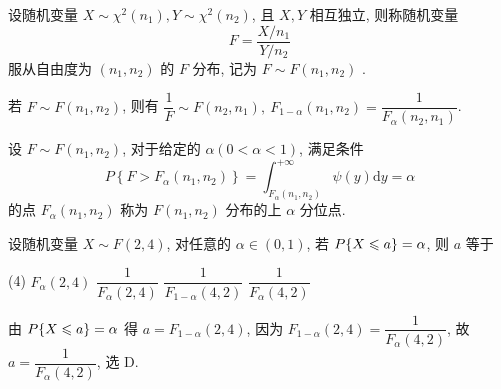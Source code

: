 \begin{definition}[$F$ 分布]
    设随机变量 $ X \sim \chi^{2}\left(n_{1}\right), Y \sim \chi^{2}\left(n_{2}\right)$, 且 $ X, Y $ 相互独立, 则称随机变量
    $$F=\frac{X / n_{1}}{Y / n_{2}}$$
    服从自由度为 $ \left(n_{1}, n_{2}\right) $ 的 $ F $ 分布, 记为 $ F \sim F\left(n_{1}, n_{2}\right)$ .
\end{definition}

\begin{theorem}
    若 $ F \sim F\left(n_{1}, n_{2}\right) $, 则有 $ \dfrac{1}{F} \sim F\left(n_{2}, n_{1}\right) ,~F_{1-\alpha}\left(n_{1}, n_{2}\right)=\dfrac{1}{F_{\alpha}\left(n_{2}, n_{1}\right)}$.
\end{theorem}

\begin{theorem}
    设 $ F \sim F\left(n_{1}, n_{2}\right) $, 对于给定的 $ \alpha(0<\alpha<1) $, 满足条件
    $$P\left\{F>F_{\alpha}\left(n_{1}, n_{2}\right)\right\}=\int_{F_{\alpha}\left(n_{1}, n_{2}\right)}^{+\infty} \psi(y) \mathrm{d} y=\alpha$$
    的点 $ F_{\alpha}\left(n_{1}, n_{2}\right) $ 称为 $ F\left(n_{1}, n_{2}\right) $ 分布的上 $ \alpha $ 分位点.
\end{theorem}

\begin{example}
    设随机变量 $X\sim F(2,4)$, 对任意的 $\alpha\in(0,1)$, 若 $P\qty{X\leqslant a}=\alpha$, 则 $a$ 等于
    \begin{tasks}(4)
        \task $F_\alpha(2,4)$
        \task $\dfrac{1}{F_\alpha(2,4)}$
        \task $\dfrac{1}{F_{1-\alpha}(4,2)}$
        \task $\dfrac{1}{F_\alpha(4,2)}$
    \end{tasks}
\end{example}
\begin{solution}
    由 $P\qty{X\leqslant a}=\alpha$ 得 $a=F_{1-\alpha}(2,4)$, 因为 $F_{1-\alpha}(2,4)=\dfrac{1}{F_\alpha(4,2)}$, 故 $a=\dfrac{1}{F_\alpha(4,2)}$, 选 D.
\end{solution}

